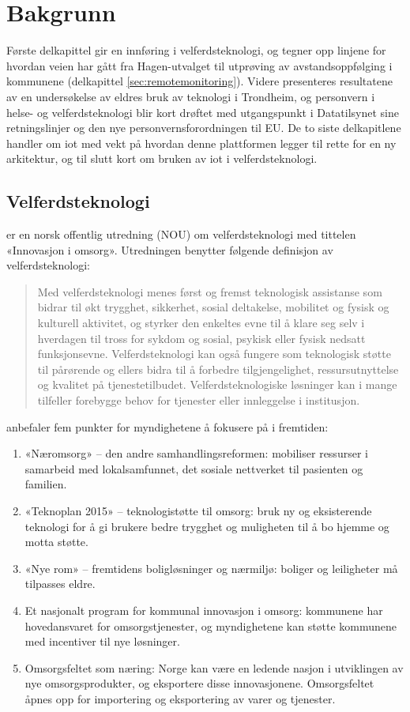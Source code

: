 \chapter{Bakgrunn}
\label{ch:background}
Første delkapittel gir en innføring i velferdsteknologi, og tegner opp linjene for hvordan veien har gått
fra Hagen-utvalget til utprøving av avstandsoppfølging i kommunene (delkapittel \ref{sec:remotemonitoring}).
Videre presenteres resultatene av en undersøkelse av eldres bruk av teknologi i Trondheim, og
personvern i helse- og velferdsteknologi blir kort drøftet med utgangspunkt i Datatilsynet sine retningslinjer
og den nye personvernsforordningen til EU. De to siste delkapitlene handler om \gls{iot} med vekt på hvordan
denne plattformen legger til rette for en ny arkitektur, og til slutt kort om bruken av \gls{iot} i velferdsteknologi.

\section{Velferdsteknologi}
\citet{regjeringen_hagen} er en norsk offentlig utredning (NOU) om velferdsteknologi med tittelen «Innovasjon i omsorg».
Utredningen benytter følgende definisjon av velferdsteknologi:

\blockquote{
Med velferdsteknologi menes først og fremst
teknologisk assistanse som bidrar til økt trygghet,
sikkerhet, sosial deltakelse, mobilitet og
fysisk og kulturell aktivitet, og styrker den
enkeltes evne til å klare seg selv i hverdagen til
tross for sykdom og sosial, psykisk eller fysisk
nedsatt funksjonsevne. Velferdsteknologi kan
også fungere som teknologisk støtte til pårørende og
ellers bidra til å forbedre tilgjengelighet,
ressursutnyttelse og kvalitet på tjenestetilbudet.
Velferdsteknologiske løsninger kan i
mange tilfeller forebygge behov for tjenester
eller innleggelse i institusjon.
}

\citet{regjeringen_hagen} anbefaler fem punkter for myndighetene å fokusere på i fremtiden:

\begin{enumerate}
    \item «Næromsorg» -- den andre samhandlingsreformen: mobiliser ressurser i samarbeid med
    lokalsamfunnet, det sosiale nettverket til pasienten og familien.
    \item «Teknoplan 2015» -- teknologistøtte til omsorg: bruk ny og eksisterende teknologi for å gi brukere
    bedre trygghet og muligheten til å bo hjemme og motta støtte.
    \item «Nye rom» -- fremtidens boligløsninger og nærmiljø: boliger og leiligheter må tilpasses eldre.
    \item Et nasjonalt program for kommunal innovasjon i omsorg: kommunene har hovedansvaret for omsorgstjenester,
    og myndighetene kan støtte kommunene med incentiver til nye løsninger.
    \item Omsorgsfeltet som næring: Norge kan være en ledende nasjon i utviklingen av nye omsorgsprodukter, og
    eksportere disse innovasjonene. Omsorgsfeltet åpnes opp for importering og eksportering av varer og tjenester.
\end{enumerate}

